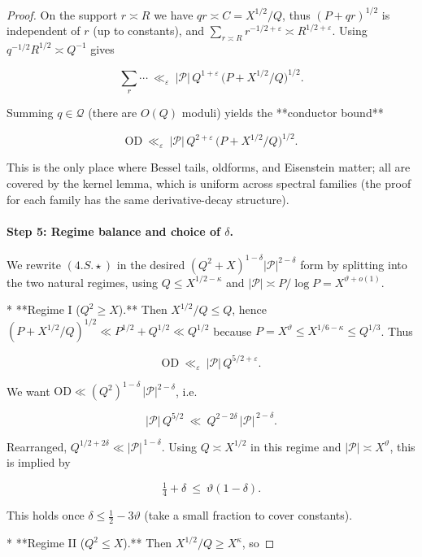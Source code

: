 \documentclass[11pt]{article}
\theoremstyle{definition}
\theoremstyle{remark}
\begin{document}
\begin{proof}
	On the support $r\asymp R$ we have $qr\asymp C=X^{1/2}/Q$, thus $(P+qr)^{1/2}$ is independent of $r$ (up to constants), and $\sum_{r\asymp R} r^{-1/2+\varepsilon}\asymp R^{1/2+\varepsilon}$. Using $q^{-1/2}R^{1/2}\asymp Q^{-1}$ gives

	$$
		\sum_{r}\cdots\ \ll_\varepsilon\ |\mathcal P|\,Q^{1+\varepsilon}\,\big(P+X^{1/2}/Q\big)^{1/2}.
	$$

	Summing $q\in\mathcal Q$ (there are $O(Q)$ moduli) yields the **conductor bound**

	\begin{equation}
		\boxed{\ \ \mathrm{OD}\ \ll_\varepsilon\ |\mathcal P|\,Q^{2+\varepsilon}\,\big(P+X^{1/2}/Q\big)^{1/2}.\ \ }
		\tag{4.S.X}
	\end{equation}

	This is the only place where Bessel tails, oldforms, and Eisenstein matter; all are covered by the kernel lemma, which is uniform across spectral families (the proof for each family has the same derivative-decay structure).

	\paragraph{Step 5: Regime balance and choice of $\delta$.}

	We rewrite $(4.S.\!\star)$ in the desired $(Q^2+X)^{1-\delta}|\mathcal P|^{2-\delta}$ form by splitting into the two natural regimes, using $Q\le X^{1/2-\kappa}$ and $|\mathcal P|\asymp P/\log P=X^{\vartheta+o(1)}$.

	* **Regime I ($Q^2\ge X$).** Then $X^{1/2}/Q\le Q$, hence $(P+X^{1/2}/Q)^{1/2}\ll P^{1/2}+Q^{1/2}\ll Q^{1/2}$ because $P=X^\vartheta\le X^{1/6-\kappa}\le Q^{1/3}$. Thus

	$$
		\mathrm{OD}\ \ll_\varepsilon\ |\mathcal P|\,Q^{5/2+\varepsilon}.
	$$

	We want $\mathrm{OD}\ll (Q^2)^{1-\delta}\,|\mathcal P|^{2-\delta}$, i.e.

	$$
		|\mathcal P|\,Q^{5/2}\ \ll\ Q^{2-2\delta}\,|\mathcal P|^{\,2-\delta}.
	$$

	Rearranged, $Q^{1/2+2\delta}\ll |\mathcal P|^{\,1-\delta}$. Using $Q\asymp X^{1/2}$ in this regime and $|\mathcal P|\asymp X^\vartheta$, this is implied by

	$$
		\tfrac14+\delta\ \le\ \vartheta(1-\delta).
	$$

	This holds once $\delta\le \tfrac12-3\vartheta$ (take a small fraction to cover constants).

	* **Regime II ($Q^2\le X$).** Then $X^{1/2}/Q\ge X^\kappa$, so


\end{proof}
\end{document}
